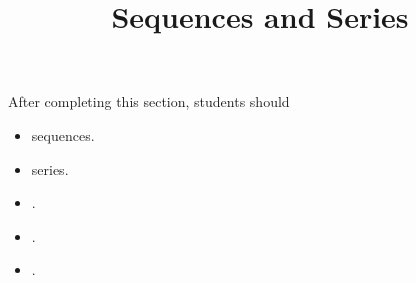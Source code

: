\documentclass{ximera}
\title{Sequences and Series}
\begin{document}
\begin{abstract}
\end{abstract}
\maketitle

\begin{sectionOutcomes}
After completing this section, students should 

\begin{itemize}
\item sequences.
\item series.
\item .
\item .
\item .
\end{itemize}
\end{sectionOutcomes}
\end{document}
